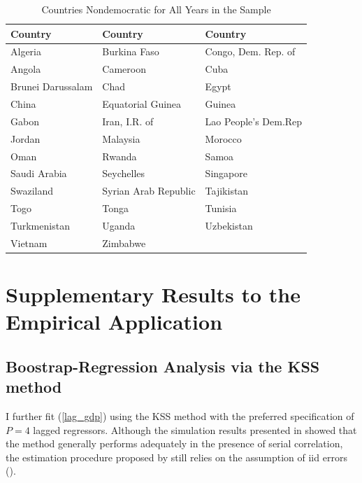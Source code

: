 \begin{appendix}
\begin{table}[h!]
  \caption{Countries Nondemocratic for All Years in the Sample}\label{nondemo_perm}
\centering
\begin{tabular}{l l l}
\hline
Country & Country & Country \\
\hline
Algeria & Burkina Faso & Congo, Dem. Rep. of \\
Angola & Cameroon & Cuba \\
Brunei Darussalam & Chad & Egypt \\
China & Equatorial Guinea & Guinea \\
Gabon & Iran, I.R. of & Lao People's Dem.Rep \\
Jordan & Malaysia & Morocco \\
Oman & Rwanda & Samoa \\
Saudi Arabia & Seychelles & Singapore \\
Swaziland & Syrian Arab Republic & Tajikistan \\
Togo & Tonga & Tunisia \\
Turkmenistan & Uganda & Uzbekistan \\
Vietnam & Zimbabwe & \\
\hline
\end{tabular}
\end{table}



\clearpage


\section{Supplementary Results to the Empirical Application}\label{application_apendix}
\thispagestyle{plainfancy}

\setcounter{table}{0}
\setcounter{figure}{0}
\renewcommand{\thetable}{C\arabic{table}}
\renewcommand{\thefigure}{C\arabic{figure}}


\subsection{Boostrap-Regression Analysis via the KSS method}\label{kss_apendix}

I further fit (\ref{lag_gdp}) using the KSS method with the preferred specification of $P = 4$ lagged regressors. Although the simulation results presented in  showed that the method generally performs adequately in the presence of serial correlation, the estimation procedure proposed by \citet{kneip2012new} still relies on the assumption of \ac{iid} errors ().  


\end{appendix}

